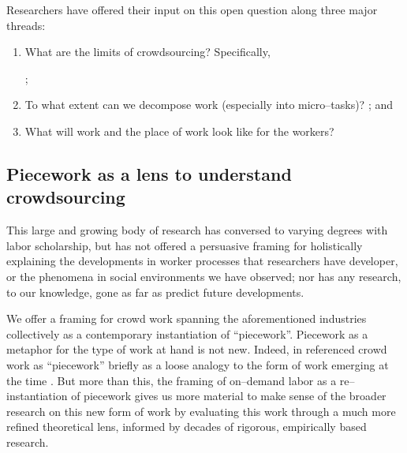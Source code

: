 \documentclass[trackingWork]{subfiles}
\begin{document}
Researchers have offered their input on this open question along three major threads:
\begin{enumerate}
  \item What are the limits of crowdsourcing?
        Specifically,
        \cite{foundry,suzukiAtelier,KimStoria,yuanAlmost,YuEncouragingOutside,
              Nebeling:2016:WCW:2858036.2858169,
              Hahn:2016:KAB:2858036.2858364};
  \item To what extent can we decompose work (especially into micro--tasks)?
        \cite{embracingErrorKrishna,bernsteinSoylent,sensitiveTasks,
              LykourentzouPersonalityMatters,KucherbaevReLauncher,
              Law:2016:CKC:2858036.2858144,Cai:2016:CRI:2858036.2858237,
              Chang:2016:ACC:2858036.2858411,Newell:2016:OMA:2858036.2858490}; and%
  \item What will work and the place of work look like for the workers?
        \cite{turkopticon,storiesIraniSilberman,dynamo,crowdcollab,
              whyWouldAnyoneBrewer,takingAHITMcInnis}
\end{enumerate}


\subsection{Piecework as a lens to understand crowdsourcing}
This large and growing body of research has conversed
to varying degrees with labor scholarship,
but has not offered a persuasive framing for holistically explaining
the developments in worker processes that researchers have developer, or
the phenomena in social environments we have observed;
nor has any research, to our knowledge,
gone as far as predict future developments.

We offer a framing for crowd work spanning the aforementioned industries
collectively as a contemporary instantiation of ``piecework''.
Piecework as a metaphor for the type of work at hand is not new.
Indeed,
\citeauthor{crowdworkFuture} in \citeyear{crowdworkFuture}
referenced crowd work as ``piecework'' briefly
as a loose analogy to the form of work emerging at the time
\cite{crowdworkFuture}.
But more than this,
the framing of on--demand labor as a re--instantiation of piecework
gives us more material to make sense of the broader research on this new form of work
by evaluating this work through a much more refined theoretical lens,
informed by decades of rigorous, empirically based research.
\end{document}
